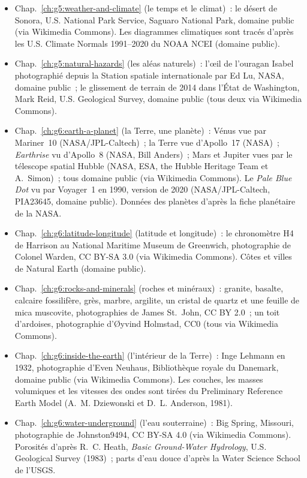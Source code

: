 \begin{itemize}
  \item Chap.~\ref{ch:g5:weather-and-climate} (le temps et le climat)~: le désert de Sonora, U.S. National Park Service, Saguaro National Park, domaine public (via Wikimedia Commons). Les diagrammes climatiques sont tracés d'après les U.S. Climate Normals 1991--2020 du NOAA NCEI (domaine public).
  \item Chap.~\ref{ch:g5:natural-hazards} (les aléas naturels)~: l'œil de l'ouragan Isabel photographié depuis la Station spatiale internationale par Ed Lu, NASA, domaine public~; le glissement de terrain de 2014 dans l'État de Washington, Mark Reid, U.S. Geological Survey, domaine public (tous deux via Wikimedia Commons).
  \item Chap.~\ref{ch:g6:earth-a-planet} (la Terre, une planète)~: Vénus vue par Mariner~10 (NASA/JPL-Caltech)~; la Terre vue d'Apollo~17 (NASA)~; \emph{Earthrise} vu d'Apollo~8 (NASA, Bill Anders)~; Mars et Jupiter vues par le télescope spatial Hubble (NASA, ESA, the Hubble Heritage Team et A.~Simon)~; tous domaine public (via Wikimedia Commons). Le \emph{Pale Blue Dot} vu par Voyager~1 en 1990, version de 2020 (NASA/JPL-Caltech, PIA23645, domaine public). Données des planètes d'après la fiche planétaire de la NASA.
  \item Chap.~\ref{ch:g6:latitude-longitude} (latitude et longitude)~: le chronomètre H4 de Harrison au National Maritime Museum de Greenwich, photographie de Colonel Warden, CC BY-SA 3.0 (via Wikimedia Commons). Côtes et villes de Natural Earth (domaine public).
  \item Chap.~\ref{ch:g6:rocks-and-minerals} (roches et minéraux)~: granite, basalte, calcaire fossilifère, grès, marbre, argilite, un cristal de quartz et une feuille de mica muscovite, photographies de James St.~John, CC BY 2.0~; un toit d'ardoises, photographie d'Øyvind Holmstad, CC0 (tous via Wikimedia Commons).
  \item Chap.~\ref{ch:g6:inside-the-earth} (l'intérieur de la Terre)~: Inge Lehmann en 1932, photographie d'Even Neuhaus, Bibliothèque royale du Danemark, domaine public (via Wikimedia Commons). Les couches, les masses volumiques et les vitesses des ondes sont tirées du Preliminary Reference Earth Model (A.~M. Dziewonski et D.~L. Anderson, 1981).
  \item Chap.~\ref{ch:g6:water-underground} (l'eau souterraine)~: Big Spring, Missouri, photographie de Johnston9494, CC BY-SA 4.0 (via Wikimedia Commons). Porosités d'après R.~C. Heath, \emph{Basic Ground-Water Hydrology}, U.S. Geological Survey (1983)~; parts d'eau douce d'après la Water Science School de l'USGS.

\end{itemize}
